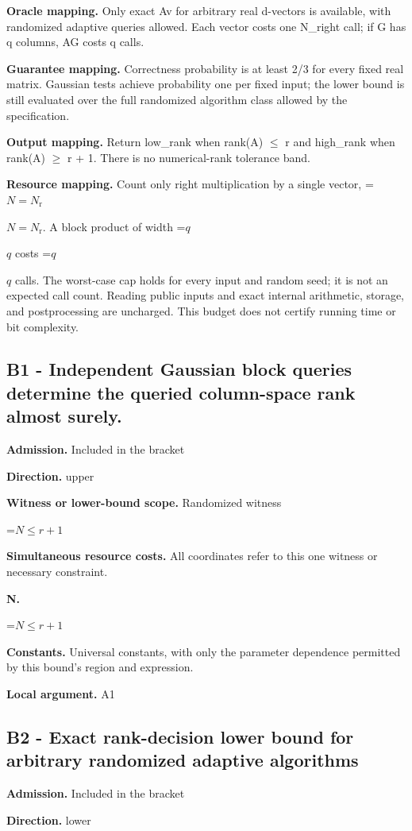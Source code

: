 \documentclass[10pt,a4paper]{article}
\newcommand{\AtlasMath}[1]{\par\begingroup\centering\setbox0=\hbox{$\displaystyle #1$}\ifdim\wd0>1.4\linewidth\typeout{ATLAS WIDE FORMULA: \the\wd0}\fi\ifdim\wd0>\linewidth\resizebox{\linewidth}{!}{\box0}\else\box0\fi\par\endgroup}
\newcommand{\AtlasInlineMath}[1]{\begingroup\setbox0=\hbox{$#1$}\ifdim\wd0>.4\linewidth\endgroup\AtlasMath{#1}\else\endgroup$#1$\fi}
\begin{document}
\textbf{Oracle mapping.} Only exact Av for arbitrary real d-vectors is available, with randomized adaptive queries allowed. Each vector costs one N\_right call; if G has q columns, AG costs q calls.

\textbf{Guarantee mapping.} Correctness probability is at least 2/3 for every fixed real matrix. Gaussian tests achieve probability one per fixed input; the lower bound is still evaluated over the full randomized algorithm class allowed by the specification.

\textbf{Output mapping.} Return low\_rank when rank(A) $\le$ r and high\_rank when rank(A) $\ge$ r + 1. There is no numerical-rank tolerance band.

\textbf{Resource mapping.} Count only right multiplication by a single vector, \AtlasInlineMath{N=N_{\mathrm r}}. A block product of width \AtlasInlineMath{q} costs \AtlasInlineMath{q} calls. The worst-case cap holds for every input and random seed; it is not an expected call count. Reading public inputs and exact internal arithmetic, storage, and postprocessing are uncharged. This budget does not certify running time or bit complexity.

\subsection{B1 - Independent Gaussian block queries determine the queried column-space rank almost surely.}
\textbf{Admission.} Included in the bracket

\textbf{Direction.} upper

\textbf{Witness or lower-bound scope.} Randomized witness

\AtlasMath{N\le r+1}
\textbf{Simultaneous resource costs.} All coordinates refer to this one witness or necessary constraint.

\textbf{N.}

\AtlasMath{N\le r+1}
\textbf{Constants.} Universal constants, with only the parameter dependence permitted by this bound’s region and expression.

\textbf{Local argument.} A1

\subsection{B2 - Exact rank-decision lower bound for arbitrary randomized adaptive algorithms}
\textbf{Admission.} Included in the bracket

\textbf{Direction.} lower
\end{document}
